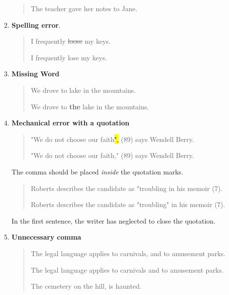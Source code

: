 \begin{enumerate}
\begin{quote}
The teacher gave her notes to Jane. 

\end{quote}

\item \textbf{Spelling error}.

\begin{quote}
I frequently \sout{loose} my keys. 

I frequently lose my keys. 

\end{quote}

\item \textbf{Missing Word}

\begin{quote}

We drove to lake in the mountains. 

We drove to \textbf{the} lake in the mountains. 
\end{quote}

\item \textbf{Mechanical error with a quotation}

\begin{quote}
"We do not choose our faith\hl{",} (89) says Wendell Berry. 

"We do not choose our faith," (89) says Wendell Berry. 
\end{quote}

 The comma should be placed \emph{inside} the quotation marks.

\begin{quote}
Roberts describes the candidate as "troubling in his memoir (7). 

Roberts describes the candidate as "troubling" in his memoir (7). 

\end{quote}

 In the first sentence, the writer has neglected to close the
quotation.

\item \textbf{Unnecessary comma}


\begin{quote}
The legal language applies to carnivals, and to amusement parks.  

The legal language applies to carnivals and to amusement parks.  

\medskip

The cemetery on the hill, is haunted. 


\end{quote}
\end{enumerate}
